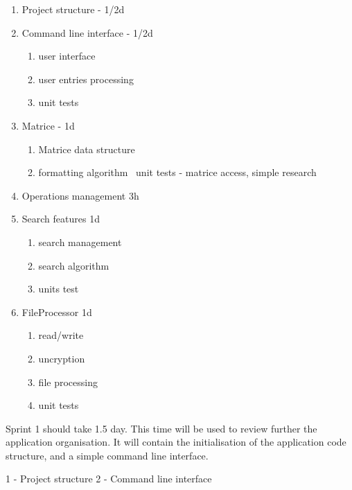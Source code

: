 \begin{enumerate}
    \item Project structure - 1/2d

    \item Command line interface - 1/2d
    \begin{enumerate}
        \item user interface
        \item user entries processing
        \item unit tests
    \end{enumerate}

    \item Matrice - 1d
    \begin{enumerate}
        \item Matrice data structure
        \item formatting algorithm
        \ unit tests - matrice access, simple research
    \end{enumerate}

    \item Operations management 3h

    \item Search features 1d
    \begin{enumerate}
        \item search management
        \item search algorithm
        \item units test
    \end{enumerate}

    \item FileProcessor 1d
    \begin{enumerate}
        \item read/write
        \item uncryption
        \item file processing
        \item unit tests
    \end{enumerate}

\end{enumerate}

Sprint 1 should take 1.5 day. This time will be used to review further the application organisation.
It will contain the initialisation of the application code structure, and a simple command line interface.

    1 - Project structure
    2 - Command line interface


